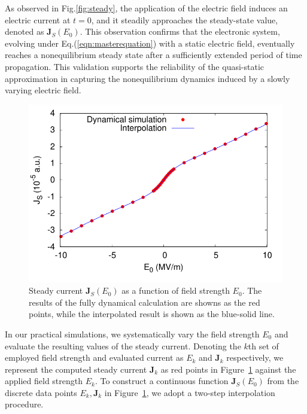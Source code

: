 As observed in Fig.\ref{fig:steady}, the application of the electric field induces an electric current at $t=0$, and it steadily approaches the steady-state value, denoted as $\mathbf J_S(E_0)$. This observation confirms that the electronic system, evolving under Eq.(\ref{eqn:masterequation}) with a static electric field, eventually reaches a nonequilibrium steady state after a sufficiently extended period of time propagation. This validation supports the reliability of the quasi-static approximation in capturing the nonequilibrium dynamics induced by a slowly varying electric field.
\begin{figure}[htbp]
	\centering
	\includegraphics[width=0.8\linewidth]{pic/jsteady_interpolate.pdf}
	\caption{\label{fig:insert}
		Steady current $\mathbf J_S(E_0)$ as a function of field strength $E_0$. The results of the fully dynamical calculation are showns as the red points, while the interpolated result is shown as the blue-solid line.}
\end{figure}

In our practical simulations, we systematically vary the field strength $E_0$ and evaluate the resulting values of the steady current. Denoting the $k$th set of employed field strength and evaluated current as $E_k$ and $\mathbf J_k$ respectively, we represent the computed steady current $\mathbf J_k$ as red points in Figure~\ref{fig:insert} against the applied field strength $E_k$. To construct a continuous function $\mathbf J_S(E_0)$ from the discrete data points ${E_k, \mathbf J_k}$ in Figure~\ref{fig:insert}, we adopt a two-step interpolation procedure.

